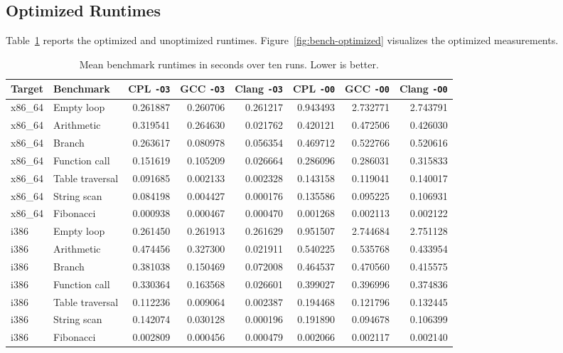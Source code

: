 \documentclass[10pt,twocolumn]{article}
\begin{document}
\subsection{Optimized Runtimes}

\par Table~\ref{tab:benchmarks} reports the optimized and unoptimized runtimes. Figure~\ref{fig:bench-optimized} visualizes the optimized measurements.

\begin{table}[t]
\centering
\scriptsize
\caption{Mean benchmark runtimes in seconds over ten runs. Lower is better.}
\label{tab:benchmarks}
\begin{tabular}{llrrrrrr}
    \toprule
    Target & Benchmark & CPL \texttt{-O3} & GCC \texttt{-O3} & Clang \texttt{-O3} & CPL \texttt{-O0} & GCC \texttt{-O0} & Clang \texttt{-O0} \\
    \midrule
    x86\_64 & Empty loop       & 0.261887 & 0.260706 & 0.261217 & 0.943493 & 2.732771 & 2.743791 \\
    x86\_64 & Arithmetic       & 0.319541 & 0.264630 & 0.021762 & 0.420121 & 0.472506 & 0.426030 \\
    x86\_64 & Branch           & 0.263617 & 0.080978 & 0.056354 & 0.469712 & 0.522766 & 0.520616 \\
    x86\_64 & Function call    & 0.151619 & 0.105209 & 0.026664 & 0.286096 & 0.286031 & 0.315833 \\
    x86\_64 & Table traversal  & 0.091685 & 0.002133 & 0.002328 & 0.143158 & 0.119041 & 0.140017 \\
    x86\_64 & String scan      & 0.084198 & 0.004427 & 0.000176 & 0.135586 & 0.095225 & 0.106931 \\
    x86\_64 & Fibonacci        & 0.000938 & 0.000467 & 0.000470 & 0.001268 & 0.002113 & 0.002122 \\
    i386 & Empty loop       & 0.261450 & 0.261913 & 0.261629 & 0.951507 & 2.744684 & 2.751128 \\
    i386 & Arithmetic       & 0.474456 & 0.327300 & 0.021911 & 0.540225 & 0.535768 & 0.433954 \\
    i386 & Branch           & 0.381038 & 0.150469 & 0.072008 & 0.464537 & 0.470560 & 0.415575 \\
    i386 & Function call    & 0.330364 & 0.163568 & 0.026601 & 0.399027 & 0.396996 & 0.374836 \\
    i386 & Table traversal  & 0.112236 & 0.009064 & 0.002387 & 0.194468 & 0.121796 & 0.132445 \\
    i386 & String scan      & 0.142074 & 0.030128 & 0.000196 & 0.191890 & 0.094678 & 0.106399 \\
    i386 & Fibonacci        & 0.002809 & 0.000456 & 0.000479 & 0.002066 & 0.002117 & 0.002140 \\
    \bottomrule
\end{tabular}
\end{table}
\end{document}
